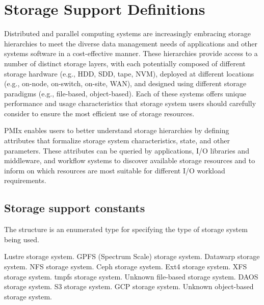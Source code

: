 \chapter{Storage Support Definitions}
\label{chap:api_storage}

Distributed and parallel computing systems are increasingly embracing storage hierarchies to meet the diverse data management needs of applications and other systems software in a cost-effective manner.
These hierarchies provide access to a number of distinct storage layers, with each potentially composed of different storage hardware (e.g., HDD, SDD, tape, NVM), deployed at different locations (e.g., on-node, on-switch, on-site, WAN), and designed using different storage paradigms (e.g., file-based, object-based).
Each of these systems offers unique performance and usage characteristics that storage system users should carefully consider to ensure the most efficient use of storage resources.

PMIx enables users to better understand storage hierarchies by defining attributes that formalize storage system characteristics, state, and other parameters.
These attributes can be queried by applications, I/O libraries and middleware, and workflow systems to discover available storage resources and to inform on which resources are most suitable for different I/O workload requirements.

\section{Storage support constants}


The  structure is an enumerated type for specifying the type of storage system being used.

\begin{constantdesc}
%
Lustre storage system.
%
GPFS (Spectrum Scale) storage system.
%
Datawarp storage system.
%
NFS storage system.
%
Ceph storage system.
%
Ext4 storage system.
%
XFS storage system.
%
tmpfs storage system.
%
Unknown file-based storage system.
%
DAOS storage system.
%
S3 storage system.
%
GCP storage system.
%
Unknown object-based storage system.
%
\end{constantdesc}


